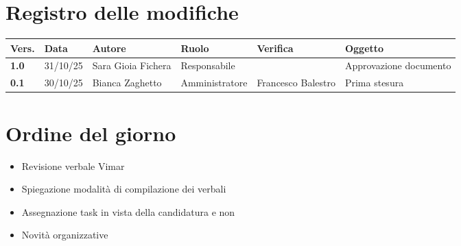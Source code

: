 \documentclass[a4paper,12pt]{article}
\begin{document}


\newpage
\section*{Registro delle modifiche}

\begin{table}[h!]
\begin{tabularx}{\textwidth}{|l|l|l|l|L|L|}
\hline
\textbf{Vers.} & \textbf{Data} & \textbf{Autore} & \textbf{Ruolo} & \textbf{Verifica} & \textbf{Oggetto} \\
\hline
\textbf{1.0} & 31/10/25 & Sara Gioia Fichera & Responsabile &  & Approvazione documento \\
\hline
\textbf{0.1} & 30/10/25 & Bianca Zaghetto & Amministratore & Francesco Balestro & Prima stesura \\
\hline
\end{tabularx}
\end{table}

\newpage
\tableofcontents
\newpage

\section{Ordine del giorno}
\begin{itemize}
    \item Revisione verbale Vimar
    \item Spiegazione modalità di compilazione dei verbali
    \item Assegnazione task in vista della candidatura e non
    \item Novità organizzative
\end{itemize}
\end{document}
